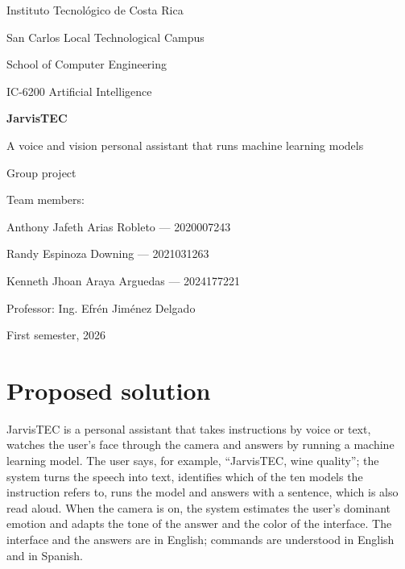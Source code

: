 \documentclass[11pt,letterpaper]{article}
\begin{document}
\begin{titlepage}
\centering
{\large Instituto Tecnológico de Costa Rica\par}
{\large San Carlos Local Technological Campus\par}
{\large School of Computer Engineering\par}
\vspace{2.5cm}
{\large IC-6200 Artificial Intelligence\par}
\vspace{1.5cm}
{\Huge\bfseries JarvisTEC\par}
\vspace{0.4cm}
{\Large A voice and vision personal assistant that runs machine learning models\par}
\vspace{2.5cm}
{\large Group project\par}
\vspace{1.5cm}
{\large Team members:\par}
Anthony Jafeth Arias Robleto --- 2020007243\par
Randy Espinoza Downing --- 2021031263\par
Kenneth Jhoan Araya Arguedas --- 2024177221\par
\vspace{1.5cm}
{\large Professor: Ing. Efrén Jiménez Delgado\par}
\vfill
{\large First semester, 2026\par}
\end{titlepage}

\tableofcontents
\newpage

\section{Proposed solution}

JarvisTEC is a personal assistant that takes instructions by voice or text, watches the user's face through the camera and answers by running a machine learning model. The user says, for example, ``JarvisTEC, wine quality''; the system turns the speech into text, identifies which of the ten models the instruction refers to, runs the model and answers with a sentence, which is also read aloud. When the camera is on, the system estimates the user's dominant emotion and adapts the tone of the answer and the color of the interface. The interface and the answers are in English; commands are understood in English and in Spanish.
\end{document}
